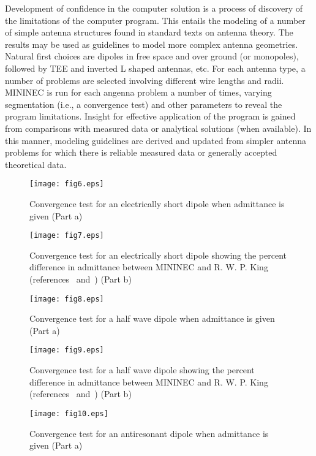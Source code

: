 \documentclass[12pt]{article}
\begin{document}
Development of confidence in the computer solution is a process of
discovery of the limitations of the computer program. This entails the
modeling of a number of simple antenna structures found in standard
texts on antenna theory. The results may be used as guidelines to model
more complex antenna geometries. Natural first choices are dipoles in
free space and over ground (or monopoles), followed by TEE and inverted
L shaped antennas, etc. For each antenna type, a number of problems are
selected involving different wire lengths and radii. MININEC is run for
each angenna problem a number of times, varying segmentation (i.e., a
convergence test) and other parameters to reveal the program
limitations. Insight for effective application of the program is gained
from comparisons with measured data or analytical solutions (when
available). In this manner, modeling guidelines are derived and updated
from simpler antenna problems for which there is reliable measured data
or generally accepted theoretical data.

\begin{sidewaysfigure}[htb]
\centerline{\texttt{[image: fig6.eps]}}
\caption{Convergence test for an electrically short dipole when
admittance is given (Part a)}
\label{fig6}
\end{sidewaysfigure}

\begin{sidewaysfigure}[htb]
\centerline{\texttt{[image: fig7.eps]}}
\caption{Convergence test for an electrically short dipole showing the
percent difference in admittance between MININEC and R. W. P. King
(references~\cite{r8} and~\cite{r9}) (Part b)}
\label{fig7}
\end{sidewaysfigure}

\begin{sidewaysfigure}[htb]
\centerline{\texttt{[image: fig8.eps]}}
\caption{Convergence test for a half wave dipole when admittance is
given (Part a)}
\label{fig8}
\end{sidewaysfigure}

\begin{sidewaysfigure}[htb]
\centerline{\texttt{[image: fig9.eps]}}
\caption{Convergence test for a half wave dipole showing the percent
difference in admittance between MININEC and R. W. P. King
(references~\cite{r8} and~\cite{r9}) (Part b)}
\label{fig9}
\end{sidewaysfigure}

\begin{sidewaysfigure}[htb]
\centerline{\texttt{[image: fig10.eps]}}
\caption{Convergence test for an antiresonant dipole when admittance is
given (Part a)}
\label{fig10}
\end{sidewaysfigure}
\end{document}
